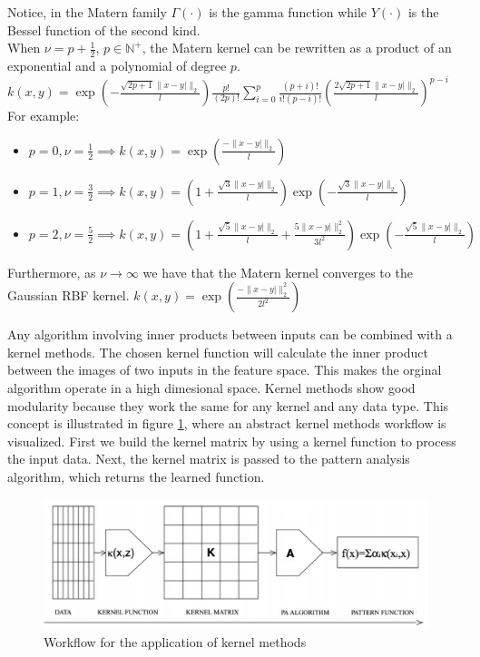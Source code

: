 Notice, in the Matern family $\Gamma(\cdot)$ is the gamma function while $Y(\cdot)$ is the Bessel function of the second kind.
\\
When $\nu=p+\frac{1}{2}$, $p \in \mathbb{N}^+$, the Matern kernel can be rewritten as a product of an exponential and a polynomial of degree $p$. 
\\
$k(x,y)=\exp \left(-{\frac {{\sqrt {2p+1}}\|x-y|\|_{2}}{l }}\right){\frac {p!}{(2p)!}}\sum _{i=0}^{p}{\frac {(p+i)!}{i!(p-i)!}}\left({\frac {2{\sqrt {2p+1}}\|x-y|\|_{2}}{l }}\right)^{p-i}$
\\
For example:
\begin{itemize}
    \item $p=0,\nu=\frac{1}{2} \implies k(x,y)=\exp\left(\frac{-\|x-y|\|_{2}}{l}\right)$
    \item $p=1,\nu=\frac{3}{2} \implies 
    k(x,y)=\left(1+{\frac {{\sqrt {3}}\|x-y|\|_{2}}{l }}\right)\exp \left(-{\frac {{\sqrt {3}}\|x-y|\|_{2}}{l }}\right)$
    \item $p=2,\nu=\frac{5}{2} \implies k(x,y)=\left(1+{\frac {{\sqrt {5}}\|x-y|\|_{2}}{l }}+{\frac {5\|x-y|\|_{2}^{2}}{3 l ^{2}}}\right)\exp \left(-{\frac {{\sqrt {5}}\|x-y|\|_{2}}{l }}\right)$
\end{itemize}

Furthermore, as $\nu \to \infty$ we have that the Matern kernel converges to the Gaussian RBF kernel.
$k(x,y)=\exp\left(\frac{-\|x-y|\|_{2}^2}{2l^2}\right)$



Any algorithm involving inner products between inputs can be combined with a kernel methods. The chosen kernel function will calculate the inner product between the images of two inputs in the feature space. This makes the orginal algorithm operate in a high dimesional space. Kernel methods show good modularity because they work the same for any kernel and any data type. This concept is illustrated in figure \ref{fig:workflow_kernels}, where an abstract kernel methods workflow is visualized. First we build the kernel matrix by using a kernel function to process the input data. Next, the kernel matrix is passed to the pattern analysis algorithm, which returns the learned function.

\begin{figure}[!ht]
    \includegraphics[width=\textwidth]{images/workflow_kernels.png}
    \caption{Workflow for the application of kernel methods \cite{shawe2004kernel}}
    \label{fig:workflow_kernels}
\end{figure}